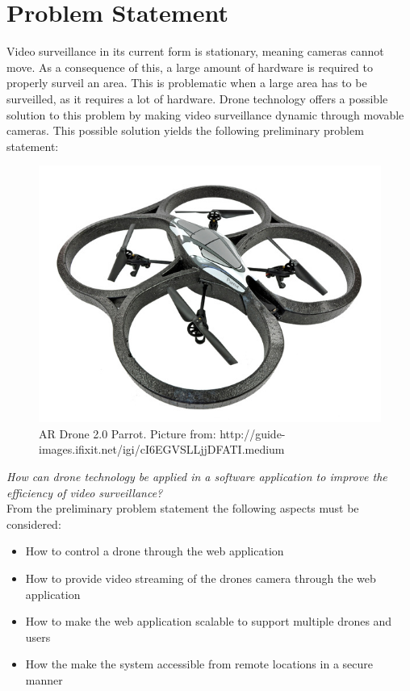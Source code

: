 \section{Problem Statement}
\label{sec:problem_definition}
Video surveillance in its current form is stationary, meaning cameras cannot move.
As a consequence of this, a large amount of hardware is required to properly surveil an area.
This is problematic when a large area has to be surveilled, as it requires a lot of hardware.
Drone technology offers a possible solution to this problem by making video surveillance dynamic through movable cameras.
This possible solution yields the following preliminary problem statement:\\

\begin{figure}[htb]
    \centering
    \includegraphics[width=\textwidth]{gfx/drone.jpg}
    \caption{AR Drone 2.0 Parrot. Picture from: http://guide-images.ifixit.net/igi/cI6EGVSLLjjDFATI.medium}
    \label{fig:pic_of_drone}
\end{figure}

\textit{How can drone technology be applied in a software application to improve the efficiency of video surveillance?}\\

From the preliminary problem statement the following aspects must be considered:
\begin{itemize}
	\item How to control a drone through the web application
	\item How to provide video streaming of the drones camera through the web application
	\item How to make the web application scalable to support multiple drones and users
	\item How the make the system accessible from remote locations in a secure manner
\end{itemize}

